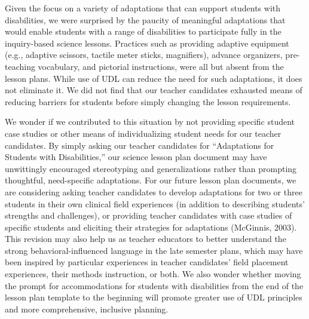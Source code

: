 \documentclass[11.5pt]{sig-alternate} %
\begin{document}
\begin{large}
Given the focus on a variety of adaptations that can support students with disabilities, we were surprised by the paucity of meaningful adaptations that would enable students with a range of disabilities to participate fully in the inquiry-based science lessons.  Practices such as providing adaptive equipment (e.g., adaptive scissors, tactile meter sticks, magnifiers), advance organizers, pre-teaching vocabulary, and pictorial instructions, were all but absent from the lesson plans.  While use of UDL can reduce the need for such adaptations, it does not eliminate it.  We did not find that our teacher candidates exhausted means of reducing barriers for students before simply changing the lesson requirements.

We wonder if we contributed to this situation by not providing specific student case studies or other means of individualizing student needs for our teacher candidates.  By simply asking our teacher candidates for “Adaptations for Students with Disabilities,” our science lesson plan document may have unwittingly encouraged stereotyping and generalizations rather than prompting thoughtful, need-specific adaptations.  For our future lesson plan documents, we are considering asking teacher candidates to develop adaptations for two or three students in their own clinical field experiences (in addition to describing students’ strengths and challenges), or providing teacher candidates with case studies of specific students and eliciting their strategies for adaptations (McGinnis, 2003).  This revision may also help us as teacher educators to better understand the strong behavioral-influenced language in the late semester plans, which may have been inspired by particular experiences in teacher candidates’ field placement experiences, their methods instruction, or both.  We also wonder whether moving the prompt for accommodations for students with disabilities from the end of the lesson plan template to the beginning will promote greater use of UDL principles and more comprehensive, inclusive planning. 


\end{large}
\end{document}
